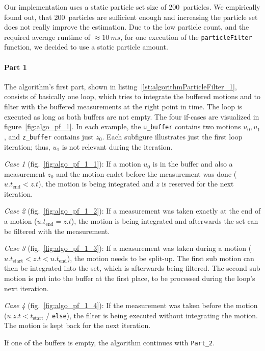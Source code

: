 Our implementation uses a static particle set size of 200~particles. We empirically found out, that 200~particles are sufficient enough and increasing the particle set does not really improve the estimation. Due to the low particle count, and the required average runtime of $\approx 10~ms$, for one execution of the \texttt{particleFilter} function, we decided to use a static particle amount.



\paragraph{Part 1} The algorithm's first part, shown in listing~\ref{lst:algorithmParticleFilter_1}, consists of basically one loop, which tries to integrate the buffered motions and to filter with the buffered measurements at the right point in time. The loop is executed as long as both buffers are not empty. The four if-cases are visualized in figure~\ref{fig:algo_pf_1}. In each example, the \texttt{u\_buffer} contains two motions $u_0, u_1$, and \texttt{z\_buffer} contains just $z_0$. Each subfigure illustrates just the first loop iteration; thus, $u_1$ is not relevant during the iteration.

\emph{Case 1} (fig.\ \ref{fig:algo_pf_1_1}): If a motion $u_0$ is in the buffer and also a measurement $z_0$ and the motion endet before the measurement was done ($u.{t_\text{end}} < z.t$), the motion is being integrated and $z$ is reserved for the next iteration.

\emph{Case 2} (fig.\ \ref{fig:algo_pf_1_2}): If a measurement was taken exactly at the end of a motion ($u.{t_\text{end}} = z.t$), the motion is being integrated and afterwards the set can be filtered with the measurement.

\emph{Case 3} (fig.\ \ref{fig:algo_pf_1_3}): If a measurement was taken during a motion ($u.{t_\text{start}} < z.t < u.{t_\text{end}}$), the motion needs to be split-up. The first sub motion can then be integrated into the set, which is afterwards being filtered. The second sub motion is put into the buffer at the first place, to be processed during the loop's next iteration.

\emph{Case 4} (fig.\ \ref{fig:algo_pf_1_4}): If the measurement was taken before the motion ($u.{z.t < t_\text{start}}$ / \texttt{else}), the filter is being executed without integrating the motion. The motion is kept back for the next iteration.

If one of the buffers is empty, the algorithm continues with \texttt{Part\_2}.

